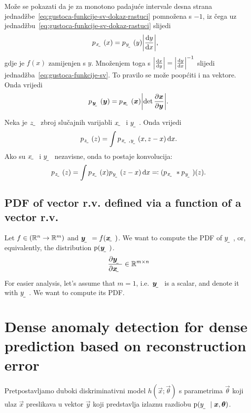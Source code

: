 \documentclass[twocolumn]{article}
\begin{document}
Može se pokazati da je za monotono padajuće intervale desna strana jednadžbe~\eqref{eq:gustoca-funkcije-sv-dokaz-rastuci} pomnožena s $-1$, iz čega uz jednadžbu~\eqref{eq:gustoca-funkcije-sv-dokaz-rastuci} slijedi
\begin{align}
p_{\rvar x}(x) &= p_{\rvar y}(y)\envert{\od{y}{x}} \text{,} \label{eq:gustoca-funkcije-sv-dokaz-xy}
\end{align}
gdje je $f(x)$ zamijenjen s $y$. Množenjem toga s $\envert{\od{x}{y}}=\envert{\od{y}{x}}^{-1}$ slijedi jednadžba~\eqref{eq:gustoca-funkcije-sv}. To pravilo se može poopćiti i na vektore. Onda vrijedi \citep{Murphy:2012:MLPP}
\begin{align}
p_{\rvec y}(\vec y)=p_\rvec{x}(\vec x)\envert{\det\pd{\vec x}{\vec y}} \text{.}
\end{align}

Neka je $\rvar z$ zbroj slučajnih varijabli $\rvar x$ i $\rvar y$. Onda vrijedi
\begin{align}
	p_{\rvar z}(z) = \int p_{\rvar x,\rvar y}(x, z-x)\dif x \text{.}
\end{align}
Ako su $\rvar x$ i $\rvar y$ nezavisne, onda to postaje konvolucija:
\begin{align} \label{eq:nezavisne-gustoce-konvolucija}
p_{\rvar z}(z) = \int p_{\rvar x}(x)p_{\rvar y}(z-x)\dif x \eqqcolon (p_{\rvar x}*p_{\rvar y})(z) \text{.}
\end{align}

\subsection{PDF of vector r.v. defined via a function of a vector r.v.}

Let $f \in (\mathbb{R}^n\to\mathbb{R}^m)$ and $\rvec y = f(\rvec x)$. We want to compute the PDF of $\rvar y$, or, equivalently, the distribution $\p(\rvec y)$.
\begin{align}
    \pd{\rvec y}{\rvec x} \in \R^{m\times n}
\end{align}

For easier analysis, let's assume that $m=1$, i.e.\ $\rvec y$ is a scalar, and denote it with $\rvar y$. We want to compute its PDF.


\section{Dense anomaly detection for dense prediction based on reconstruction error}

Pretpostavljamo duboki diskriminativni model $h(\vec x;\vec\theta)$ s parametrima $\vec\theta$ koji ulaz $\vec x$ preslikava u vektor $\vec y$ koji predstavlja izlaznu razdiobu  $\p(\rvar y\mid \vec x, \vec\theta)$.
\end{document}
